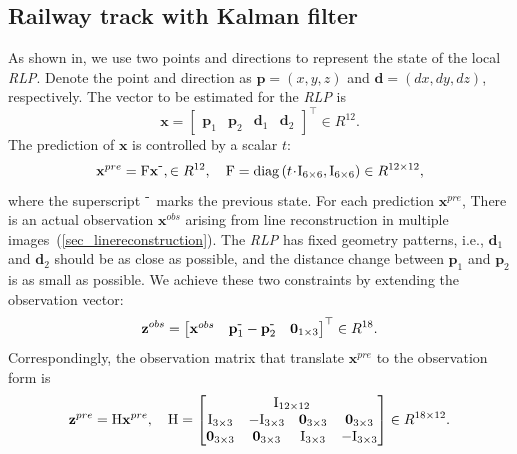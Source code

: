 \subsection{Railway track with Kalman filter}
As shown in, 
we use two points and directions to represent the state of the local \textit{RLP}.
Denote the point and direction as
$\mathbf p=\left(x,y,z\right)$ and $\mathbf d=\left(dx,dy,dz\right)$,
respectively.
The vector to be estimated for the \textit{RLP} is
\begin{equation}
\mathbf x = \begin{bmatrix}
    \mathbf p_1 & \mathbf p_2 & \mathbf d_1  & \mathbf d_2 
\end{bmatrix}^ \top \in R^{12}.
\label{eq_prediction3} 
\end{equation}
The prediction of $\mathbf x$ is controlled by a scalar $t$:
\begin{equation}
        \mathbf{x}^{pre}= 
        \mathrm F \mathbf x^{{\mbox -}}, \in R^{12}, \quad  
        \mathrm F=\operatorname{diag}\left(t \! \cdot \! \mathrm I_{6\times6} , \mathrm I_{6\times6}\right) \in R^{12\times 12},
        \label {eq_statetransition}
\end{equation}
where the superscript $^{\mbox -}$ marks the previous state.
For each prediction $\mathbf{x}^{pre}$,
There is an actual observation $\mathbf{x}^{obs}$ arising from line reconstruction in multiple images~(\cref*{sec_linereconstruction}).
The \textit{RLP} has fixed geometry patterns,
i.e.,
$\mathbf d_1$ and $\mathbf d_2$ should be as close as possible,
and the distance change between $\mathbf p_1$ and $\mathbf p_2$ is as small as possible.
We achieve these two constraints by extending the observation vector:
\begin{equation}
\mathbf{z}^{obs} = \begin{bmatrix}
    \mathbf{x}^{obs} & \mathbf p_1^{\mbox -} - \mathbf p_{2}^{\mbox -} & \mathbf 0_{1\times3}
\end{bmatrix}^ \top \in R^{18}.
\label {eq_observationvector}
\end{equation}
Correspondingly,
the observation matrix that translate $\mathbf{x}^{pre}$ to the observation form is
\begin{equation}
        \mathbf{z}^{pre}= 
        \mathrm H \mathbf x^{pre}, \quad  
        \mathrm H=
        \begin{bmatrix}
            \multicolumn{4}{c}{\mathrm{I}_{12 \times 12}} \\
            \mathrm{I}_{3 \times 3} & -\mathrm{I}_{3 \times 3} & \mathbf{0}_{3 \times 3} & \mathbf{0}_{3 \times 3} \\
            \mathbf{0}_{3 \times 3} & \mathbf{0}_{3 \times 3} & \mathrm{I}_{3 \times 3} & -\mathrm{I}_{3 \times 3}
        \end{bmatrix} \in R^{18 \times 12}.
        \label {eq_observationmatrix }
\end{equation}
